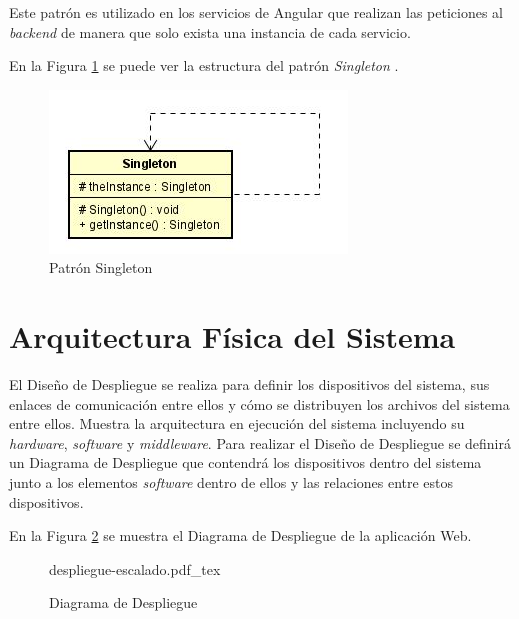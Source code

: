  Este patrón es utilizado en los servicios de Angular que realizan las peticiones al \textit{backend} de manera que solo exista una instancia de cada servicio.
 
 En la Figura \ref{fig:singleton} se puede ver la estructura del patrón \textit{Singleton} \cite{yania}.
 
 \begin{figure}
     \centering
     \includegraphics[scale=0.7]{img/singleton-nuevo.jpg}
     \caption{Patrón Singleton}
     \label{fig:singleton}
 \end{figure}





\section{Arquitectura Física del Sistema}
El Diseño de Despliegue \cite{diagrama-despliegue} se realiza para definir los dispositivos del sistema, sus enlaces de comunicación entre ellos y cómo se distribuyen los archivos del sistema entre ellos. Muestra la arquitectura en ejecución del sistema incluyendo su \textit{hardware}, \textit{software} y \textit{middleware}. Para realizar el Diseño de Despliegue se definirá un Diagrama de Despliegue que contendrá los dispositivos dentro del sistema junto a los elementos \textit{software} dentro de ellos y las relaciones entre estos dispositivos. 

En la Figura \ref{fig:diagrama-despliegue} se muestra el Diagrama de Despliegue de la aplicación Web.

\begin{figure}
    \centering
    \begin{normalsize}
        {despliegue-escalado.pdf_tex}
    \end{normalsize}
    \caption{Diagrama de Despliegue}
     \label{fig:diagrama-despliegue}
 
 \end{figure}



